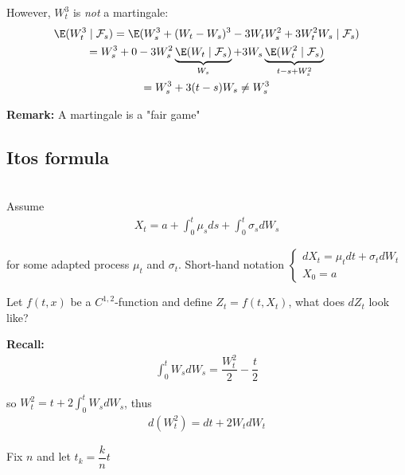 \noindent However, $W_t^3$ is \textit{not} a martingale:
\begin{equation*}
  \begin{gathered}
    \E(W_t^3\mid\mathcal{F}_s) = \E(W_s^3+(W_t-W_s)^3-3W_tW_s^2+3W_t^2W_s\mid\mathcal{F}_s)\\
    = W_s^3+0-3W_s^2\underbrace{\E(W_t\mid\mathcal{F}_s)}_{W_s} + 3W_s\underbrace{\E(W_t^2\mid\mathcal{F}_s)}_{t-s+W_s^2}\\
    = W_s^3+3(t-s)W_s\neq W_s^3
  \end{gathered}
\end{equation*}
\par\bigskip
\noindent\textbf{Remark:} A martingale is a "fair game"
\par\bigskip
\subsection{Itos formula}\hfill\\
\noindent Assume 
\begin{equation*}
  \begin{gathered}
    X_t = a+\int_{0}^{t}\mu_sds + \int_{0}^{t}\sigma_sdW_s
  \end{gathered}
\end{equation*}\par
\noindent for some adapted process $\mu_t$ and $\sigma_t$. Short-hand notation $\begin{cases}dX_t = \mu_tdt+\sigma_tdW_t\\X_0=a\end{cases}$
\par\bigskip
\noindent Let $f(t,x)$ be a $C^{1,2}$-function and define $Z_t = f(t,X_t)$, what does $dZ_t$ look like?
\par\bigskip
\noindent\textbf{Recall:}
\begin{equation*}
  \begin{gathered}
    \int_{0}^{t}W_sdW_s = \dfrac{W_t^2}{2}-\dfrac{t}{2}
  \end{gathered}
\end{equation*}\par
\noindent so $W_t^2 = t+2\int_{0}^{t}W_sdW_s$, thus 
\begin{equation*}
  \begin{gathered}
    d(W_t^2) = dt +2W_tdW_t
  \end{gathered}
\end{equation*}\par
\noindent Fix $n$ and let $t_k = \dfrac{k}{n}t$\par
